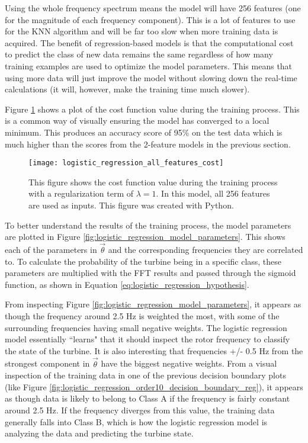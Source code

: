 Using the whole frequency spectrum means the model will have 256 features (one for the magnitude of each frequency component).  This is a lot of features to use for the KNN algorithm and will be far too slow when more training data is acquired.  The benefit of regression-based models is that the computational cost to predict the class of new data remains the same regardless of how many training examples are used to optimize the model parameters.  This means that using more data will just improve the model without slowing down the real-time calculations (it will, however, make the training time much slower).

Figure \ref{fig:logistic_regression_all_features_cost} shows a plot of the cost function value during the training process.  This is a common way of visually ensuring the model has converged to a local minimum. This produces an accuracy score of 95\% on the test data which is much higher than the scores from the 2-feature models in the previous section.

\begin{figure}
	\centering
	\texttt{[image: logistic\_regression\_all\_features\_cost]}
	\decoRule
	\caption{This figure shows the cost function value during the training process with a regularization term of $\lambda=1$.  In this model, all 256 features are used as inputs.  This figure was created with Python.}
	\label{fig:logistic_regression_all_features_cost}
\end{figure}

To better understand the results of the training process, the model parameters are plotted in Figure \ref{fig:logistic_regression_model_parameters}.  This shows each of the parameters in $\vec{\theta}$ and the corresponding frequencies they are correlated to.  To calculate the probability of the turbine being in a specific class, these parameters are multiplied with the FFT results and passed through the sigmoid function, as shown in Equation \ref{eq:logistic_regression_hypothesis}.

From inspecting Figure \ref{fig:logistic_regression_model_parameters}, it appears as though the frequency around 2.5 Hz is weighted the most, with some of the surrounding frequencies having small negative weights.  The logistic regression model essentially ``learns" that it should inspect the rotor frequency to classify the state of the turbine.    It is also interesting that frequencies +/- 0.5 Hz from the strongest component in $\vec{\theta}$ have the biggest negative weights.  From a visual inspection of the training data in one of the previous decision boundary plots (like Figure \ref{fig:logistic_regression_order10_decision_boundary_reg}), it appears as though data is likely to belong to Class A if the frequency is fairly constant around 2.5 Hz.  If the frequency diverges from this value, the training data generally falls into Class B, which is how the logistic regression model is analyzing the data and predicting the turbine state.


